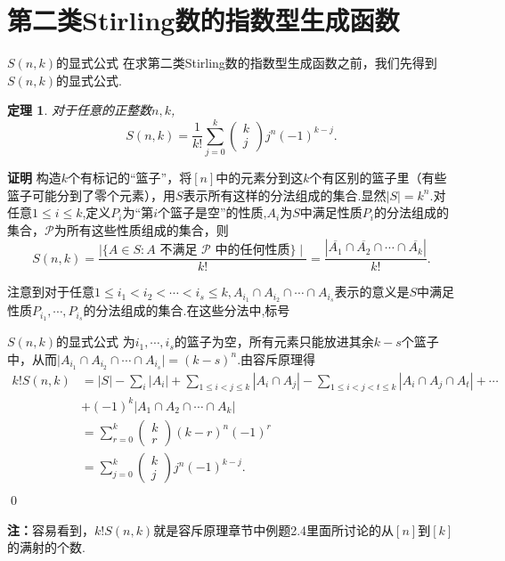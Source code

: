 \documentclass[punct]{ctexbeamer}
\newtheorem{thm}{定理}[section]
\begin{document}
\section{第二类Stirling数的指数型生成函数} 
\begin{frame}{$S(n, k)$的显式公式}
	在求第二类Stirling数的指数型生成函数之前，我们先得到$S(n, k)$的显式公式.
	\begin{thm}
			对于任意的正整数$n,k$,
		$$
		S(n, k)=\frac{1}{k!}\sum_{j=0}^k\left(\begin{array}{l}
		k \\
		j
		\end{array}\right) j^n(-1)^{k-j}.
		$$
	\end{thm}
{\bf 证明}
构造$k$个有标记的“篮子”，将$[n]$中的元素分到这$k$个有区别的篮子里（有些篮子可能分到了零个元素），用$S$表示所有这样的分法组成的集合.显然$ \mid S \mid=k^n$.对任意$1\le i\le k$,定义$P_i$为“第$i$个篮子是空”的性质,$A_i$为$S$中满足性质$P_i$的分法组成的集合，$\mathcal{P}$为所有这些性质组成的集合，则
$$S(n, k) =\frac{\mid\{A \in S: A \text { 不满足 } \mathcal{P} \text { 中的任何性质}\}\mid}{k !}=\frac{\left|\overline{A_1} \cap \overline{A_2} \cap \cdots \cap \overline{A_k}\right|}{k !} . $$

注意到对于任意$1 \leq i_1<i_2<\cdots<i_s \leq k, A_{i_1} \cap A_{i_2} \cap \cdots \cap A_{i_s} $表示的意义是$S$中满足性质$P_{i_1},\cdots,P_{i_s}$的分法组成的集合.在这些分法中,标号

\end{frame}	
\begin{frame}{$S(n, k)$的显式公式}	
	为${i_1},\cdots,{i_s}$的篮子为空，所有元素只能放进其余$k-s$个篮子中，从而$\mid A_{i_1}\cap A_{i_2}\cap\cdots\cap A_{i_s}\mid=(k-s)^n$.由容斥原理得
	$$
	\begin{aligned}
	k ! S(n, k) 
	&=|S|-\sum_i\left|A_i\right|+\sum_{1 \leq i<j \leq k}\left|A_i \cap A_j\right|-\sum_{1 \leq i<j<t \leq k}\left|A_i \cap A_j \cap A_t\right|+\cdots \\
	&+(-1)^k\left|A_1 \cap A_2 \cap \cdots \cap A_k\right| \\
	&=\sum_{r=0}^k\left(\begin{array}{c}
	k \\
	r
	\end{array}\right)(k-r)^n(-1)^r \\
	&=\sum_{j=0}^k\left(\begin{array}{c}
	k \\
	j
	\end{array}\right) j^n(-1)^{k-j} . \\
	\end{aligned}
	$$\qed
	
{\bf 注：}容易看到，$k ! S(n, k) $就是容斥原理章节中例题2.4里面所讨论的从$[n]$到$[k]$的满射的个数.
	
	
\end{frame}	
\end{document}
